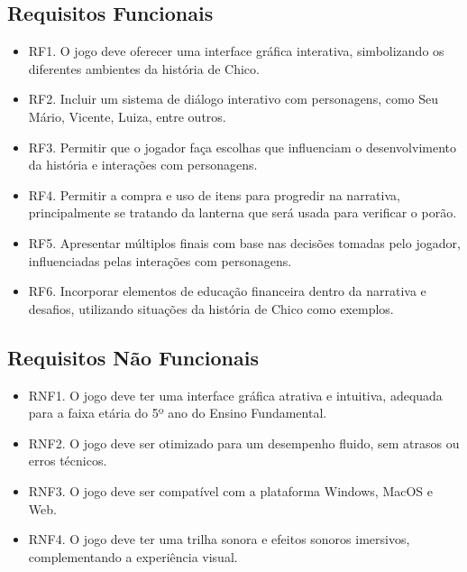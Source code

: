 \subsection*{Requisitos Funcionais}
\begin{itemize}
	\item RF1. O jogo deve oferecer uma interface gráfica interativa, simbolizando os diferentes ambientes da história de Chico.
	\item RF2. Incluir um sistema de diálogo interativo com personagens, como Seu Mário, Vicente, Luiza, entre outros.
	\item RF3. Permitir que o jogador faça escolhas que influenciam o desenvolvimento da história e interações com personagens.
	\item RF4. Permitir a compra e uso de itens para progredir na narrativa, principalmente se tratando da lanterna que será usada para verificar o porão.
	\item RF5. Apresentar múltiplos finais com base nas decisões tomadas pelo jogador, influenciadas pelas interações com personagens.
	\item RF6. Incorporar elementos de educação financeira dentro da narrativa e desafios, utilizando situações da história de Chico como exemplos.
\end{itemize}

\subsection*{Requisitos Não Funcionais}
\begin{itemize}
	\item RNF1. O jogo deve ter uma interface gráfica atrativa e intuitiva, adequada para a faixa etária do 5º ano do Ensino Fundamental.
	\item RNF2. O jogo deve ser otimizado para um desempenho fluido, sem atrasos ou erros técnicos.
	\item RNF3. O jogo deve ser compatível com a plataforma Windows, MacOS e Web.
	\item RNF4. O jogo deve ter uma trilha sonora e efeitos sonoros imersivos, complementando a experiência visual.
\end{itemize}

